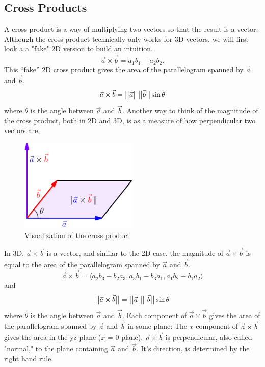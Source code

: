 \subsection{Cross Products}
\noindent
A cross product is a way of multiplying two vectors so that the result is a vector.
Although the cross product technically only works for 3D vectors, we will first look a a "fake" 2D version to build an intuition.
\begin{equation*}
	\vec{a}\times\vec{b} = a_1b_1-a_2b_2.
\end{equation*}
This ``fake'' 2D cross product gives the area of the parallelogram spanned by $\vec{a}$ and $\vec{b}$.
\begin{equation*}
	\vec{a}\times\vec{b} = \big\lvert \big\lvert \vec{a} \big\rvert \big\rvert\big\lvert \big\lvert \vec{b} \big\rvert \big\rvert\sin{\theta}
\end{equation*}
where $\theta$ is the angle between $\vec{a}$ and $\vec{b}$.
Another way to think of the magnitude of the cross product, both in 2D and 3D, is as a measure of how perpendicular two vectors are.

\begin{figure}[H]
	\centering
	\includegraphics[width=0.5\textwidth]{./Images/backgroundReview/CrossProduct.png}
	\caption{Visualization of the cross product}
\end{figure}

\noindent
In 3D, $\vec{a}\times\vec{b}$ is a vector, and similar to the 2D case, the magnitude of $\vec{a}\times\vec{b}$ is equal to the area of the parallelogram spanned by $\vec{a}$ and $\vec{b}$.
\begin{equation*}
	\vec{a}\times\vec{b} = \langle a_2b_3-b_2a_3,a_3b_1-b_3a_1,a_1b_2-b_1a_2 \rangle
\end{equation*}
and
\begin{equation*}
	\big\lvert \big\lvert \vec{a}\times\vec{b} \big\rvert \big\rvert=\big\lvert \big\lvert \vec{a} \big\rvert \big\rvert\big\lvert \big\lvert \vec{b} \big\rvert \big\rvert\sin{\theta}
\end{equation*}
where $\theta$ is the angle between $\vec{a}$ and $\vec{b}$.
Each component of $\vec{a}\times\vec{b}$ gives the area of the parallelogram spanned by $\vec{a}$ and $\vec{b}$ in some plane:
The $x$-component of $\vec{a}\times\vec{b}$ gives the area in the yz-plane ($x$ = 0 plane).
$\vec{a}\times\vec{b}$ is perpendicular, also called "normal," to the plane containing $\vec{a}$ and $\vec{b}$. It's direction, is determined by the right hand rule.\\

